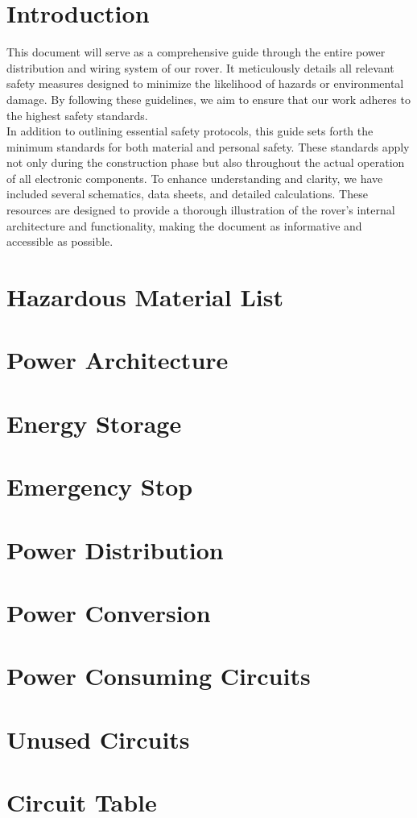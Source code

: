 \section{Introduction}

This document will serve as a comprehensive guide through the entire power distribution and wiring system of our rover. It meticulously details all relevant safety measures designed to minimize the likelihood of hazards or environmental damage. By following these guidelines, we aim to ensure that our work adheres to the highest safety standards. \\

In addition to outlining essential safety protocols, this guide sets forth the minimum standards for both material and personal safety. These standards apply not only during the construction phase but also throughout the actual operation of all electronic components. To enhance understanding and clarity, we have included several schematics, data sheets, and detailed calculations. These resources are designed to provide a thorough illustration of the rover's internal architecture and functionality, making the document as informative and accessible as possible.

\section{Hazardous Material List}


\section{Power Architecture}



\section{Energy Storage}

\section{Emergency Stop}

\section{Power Distribution}

\section{Power Conversion}

\section{Power Consuming Circuits}

\section{Unused Circuits}

\section{Circuit Table}




